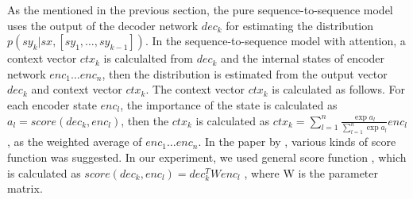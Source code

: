 \documentclass[senior,final,11pt]{iscs-thesis}
\begin{document}
As the mentioned in the previous section, the pure sequence-to-sequence model uses the output of the decoder network $ dec_{k} $ for estimating 
the distribution $ p(sy_k|sx,[sy_1,\dots,sy_{k-1}]) $.
In the sequence-to-sequence model with attention, 
a context vector $ ctx_{k} $ is calculalted from $ dec_{k} $ and the internal states of encoder network $ enc_{1} \dots enc_{n} $, 
then the distribution is estimated from the output vector $ dec_{k} $ and context vector $ ctx_{k} $.
The context vector $ ctx_{k} $ is calculated as follows.
For each encoder state $ enc_{l} $, the importance of the state is calculated as $ a_{l} = score(dec_{k},enc_{l}) $,
then the $ ctx_{k} $ is calculated as $ ctx_{k} = \sum_{l=1}^{n} \frac{\exp{a_{l}}}{\sum_{l=1}^{n}\exp{a_{l}}} enc_{l} $, 
as the weighted average of $ enc_{1} \dots enc_{n} $.
In the paper by \citet{dot_attention}, various kinds of score function was suggested.
In our experiment, we used general score function , which is calculated as $ score(dec_{k},enc_{l}) = dec_{k}^T W enc_{l} $ ,
where W is the parameter matrix.






\end{document}
